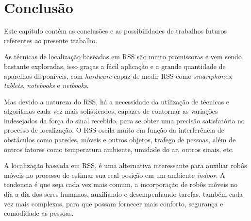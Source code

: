 \chapter{Conclusão}
\label{conclusao}
\begin{comment}
  Os robôs vem sendo muito utilizados na automatização de tarefas, e nesse trabalho 
  podemos perceber que  uma tarefa simples, como deslocar um robô de um lugar a outro, 
  de forma autônoma, exige técnicas complexas de estatística e de várias áreas da 
  computação como inteligência artificial, geometria computacional e processamento de 
  imagens.
  
    O conceito por trás desse trabalho é muito promissor, pois, a idéia de poder clicar em um mapa, ou falar o endereço onde você deseja ir,
    e seu celular ou tablet dirige seu carro para você, sem precisar tocar no volante, é extremamente interessante.
\end{comment}
    Este capitulo contém as conclusões e as possibilidades de trabalhos futuros referentes ao presente 
    trabalho.
  
   As técnicas de localização baseadas em RSS são muito promissoras e 
  vem sendo bastante exploradas, isso graças a fácil aplicação e a grande 
  quantidade de aparelhos disponíveis, 
  com \textit{hardware} capaz de medir RSS como \textit{smartphones}, \textit{tablets}, \textit{notebooks} e \textit{netbooks}.
  
   Mas devido a natureza do RSS, há a necessidade da utilização de técnicas e 
  algoritmos cada vez mais sofisticados, capazes de contornar as variações indesejados
  da força do sinal recebido, para se obter uma precisão satisfatória no processo de 
  localização. O RSS oscila muito em função da interferência 
   de obstáculos como paredes, 
   móveis e outros objetos, trafego de pessoas, além de outros fatores como temperatura ambiente, 
   umidade do ar, outros sinais, etc.
  
   A localização baseada em RSS, é uma alternativa interessante para auxiliar robôs móveis
   no processo de estimar sua real posição em um ambiente \textit{indoor}. A tendencia é que 
   seja cada vez mais comum, a incorporação de robôs móveis no dia-a-dia dos seres humanos,
   auxiliando e desempenhando tarefas, também cada vez mais complexas, para que possam 
   fornecer mais conforto, segurança e comodidade as pessoas.
   
